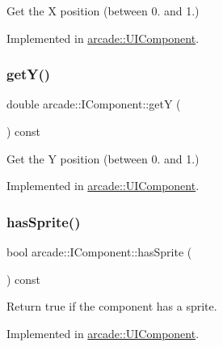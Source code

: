 Get the X position (between 0. and 1.) 



Implemented in \hyperlink{classarcade_1_1_u_i_component_a8da01c706810692c7c3f0711c957fb15}{arcade\+::\+U\+I\+Component}.

\mbox{\label{classarcade_1_1_i_component_ad19f185c30ab99ed831d2c68fabf920f}} 
\subsubsection{\texorpdfstring{get\+Y()}{getY()}}
{\footnotesize\ttfamily double arcade\+::\+I\+Component\+::getY (\begin{DoxyParamCaption}{ }\end{DoxyParamCaption}) const\hspace{0.3cm}{\ttfamily [pure virtual]}}



Get the Y position (between 0. and 1.) 



Implemented in \hyperlink{classarcade_1_1_u_i_component_af5360eec3a1a473484df1df5f7d89ee9}{arcade\+::\+U\+I\+Component}.

\mbox{\label{classarcade_1_1_i_component_a03ea8019a23fd44731a06548ef7e6ff3}} 
\subsubsection{\texorpdfstring{has\+Sprite()}{hasSprite()}}
{\footnotesize\ttfamily bool arcade\+::\+I\+Component\+::has\+Sprite (\begin{DoxyParamCaption}{ }\end{DoxyParamCaption}) const\hspace{0.3cm}{\ttfamily [pure virtual]}}



Return true if the component has a sprite. 



Implemented in \hyperlink{classarcade_1_1_u_i_component_a0f41ff1be1ae457a3be0856553e904f4}{arcade\+::\+U\+I\+Component}.

